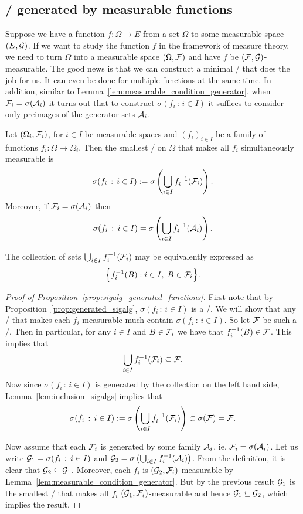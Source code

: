 \subsection{\sigalgs/ generated by measurable functions}

Suppose we have a function $f : \Omega \to E$ from a set $\Omega$ to some measurable space $(E, \mathcal G)$. If we want to study the function $f$ in the framework of measure theory, we need to turn $\Omega$ into a measurable space $(\Omega, \mathcal F)$ and have $f$ be $(\mathcal F, \mathcal G)$-measurable. The good news is that we can construct a minimal \sigalg/ that does the job for us. It can even be done for multiple functions at the same time. In addition, similar to Lemma~\ref{lem:measurable_condition_generator}, when $\mathcal F_i = \sigma(\mathcal A_i)$ it turns out that to construct $\sigma(f_i \, : \, i \in I)$ it suffices to consider only preimages of the generator sets $\mathcal A_i$.

\begin{proposition}\label{prop:sigalg_generated_functions}
Let $(\Omega_i, \mathcal F_i)$, for $i \in I$ be measurable spaces and $(f_i)_{i \in I}$ be a family of functions $f_i : \Omega \to \Omega_i$. Then the smallest \sigalg/ on $\Omega$ that makes all $f_i$ simultaneously measurable is
\[
	\sigma(f_i \, : \, i \in I):=\sigma\left(\bigcup_{i \in I} f_i^{-1}(\mathcal F_i)\right).
\] 
Moreover, if $\mathcal F_i = \sigma(\mathcal A_i)$ then 
\[
	\sigma(f_i \, : \, i \in I) = \sigma\left(\bigcup_{i \in I} f_i^{-1}(\mathcal A_i)\right).
\] 
\end{proposition}

\begin{remark}
	The collection of sets $\bigcup_{i \in I} f_i^{-1}(\mathcal F_i)$ may be equivalently expressed as
	\[
		\Bigl\{f_i^{-1}(B) : i\in I,\; B\in \mathcal F_i\Bigr\}.
	\]
\end{remark}


\begin{proof}[Proof of Proposition~\ref{prop:sigalg_generated_functions}]
First note that by Proposition~\ref{prop:generated_sigalg}, $\sigma(f_i \, : \, i \in I)$ is a \sigalg/. We will show that any \sigalg/ that makes each $f_i$ measurable much contain $\sigma(f_i \, : \, i \in I)$. So let $\mathcal F$ be such a \sigalg/. Then in particular, for any $i\in I$ and $B \in \mathcal F_i$ we have that $f_i^{-1}(B) \in \mathcal F$. This implies that
\[
	\bigcup_{i \in I} f_i^{-1}(\mathcal F_i) \subseteq \mathcal F.
\]
Now since $\sigma(f_i \, : \, i \in I)$ is generated by the collection on the left hand side, Lemma~\ref{lem:inclusion_sigalgs} implies that 
\[
	\sigma(f_i \, : \, i \in I):=\sigma\left(\bigcup_{i \in I} f_i^{-1}(\mathcal F_i)\right) \subset \sigma(\mathcal F) = \mathcal F.
\]

Now assume that each $\mathcal F_i$ is generated by some family $\mathcal A_i$, ie. $\mathcal F_i = \sigma(\mathcal A_i)$. Let us write $\mathcal G_1 = \sigma(f_i \, : \, i \in I)$ and $\mathcal G_2 = \sigma\left(\bigcup_{i \in I} f_i^{-1}(\mathcal A_i)\right)$. From the definition, it is clear that $\mathcal G_2 \subseteq \mathcal G_1$. Moreover, each $f_i$ is $(\mathcal G_2, \mathcal F_i)$-measurable by Lemma~\ref{lem:measurable_condition_generator}. But by the previous result $\mathcal G_1$ is the smallest \sigalg/ that makes all $f_i$ $(\mathcal G_1, \mathcal F_i)$-measurable and hence $\mathcal G_1 \subseteq \mathcal G_2$, which implies the result.
\end{proof}

